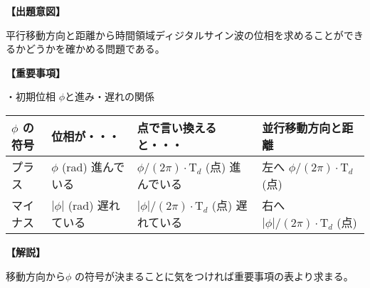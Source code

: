 \noindent \textbf{【出題意図】}

\bigskip
\noindent 平行移動方向と距離から時間領域ディジタルサイン波の位相を求めることができるかどうかを確かめる問題である。

\vspace{1em}
\noindent \textbf{【重要事項】}

\noindent ・初期位相 $\phi$と進み・遅れの関係

\medskip
\begin{center}
\small
\begin{tabularx}{0.9\fbwidth}{|X|X|X|X|}
\hline
$\phi$ の符号&  位相が・・・   & 点で言い換えると・・・   & 並行移動方向と距離 \\
\hline
プラス &  $\phi$ (rad) 進んでいる & $\phi/(2\pi) \cdot \textrm{T}_d$ (点) 進んでいる & 左へ $\phi/(2\pi) \cdot \textrm{T}_d$ (点) \\
\hline
マイナス &  $|\phi|$ (rad) 遅れている & $|\phi|/(2\pi) \cdot \textrm{T}_d$ (点) 遅れている & 右へ $|\phi|/(2\pi) \cdot \textrm{T}_d$ (点) \\
\hline
\end{tabularx}
\end{center}

\bigskip

\vspace{1em}
\noindent \textbf{【解説】}

\bigskip
\noindent 移動方向から$\phi$ の符号が決まることに気をつければ重要事項の表より求まる。
